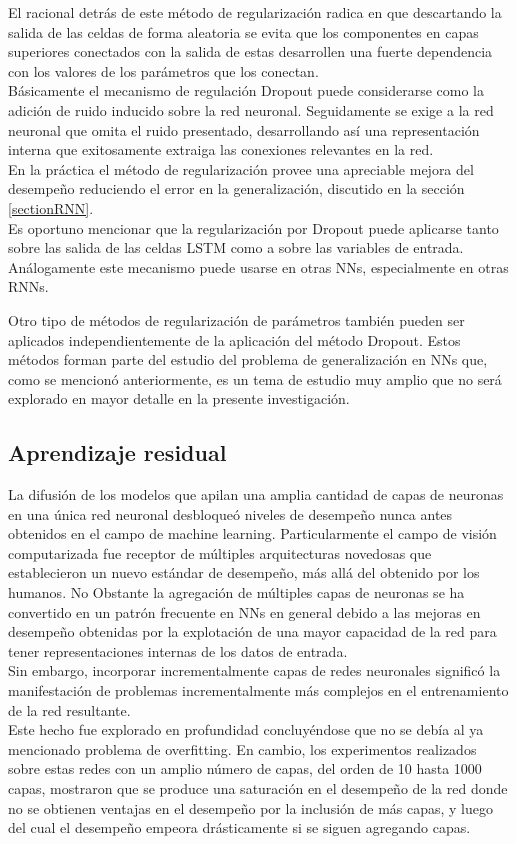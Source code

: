 \documentclass{article}
\begin{document}
	El racional detrás de este método de regularización radica en que descartando la salida de las celdas de forma aleatoria se evita que los componentes en capas superiores conectados con la salida de estas desarrollen una fuerte dependencia con los valores de los parámetros que los conectan.\\
	Básicamente el mecanismo de regulación Dropout puede considerarse como la adición de ruido inducido sobre la red neuronal. Seguidamente se exige a la red neuronal que omita el ruido presentado, desarrollando así una representación interna que exitosamente extraiga las conexiones relevantes en la red.\\
	
	En la práctica el método de regularización provee una apreciable mejora del desempeño reduciendo el error en la generalización, discutido en la sección \ref{sectionRNN}.\\
	Es oportuno mencionar que la regularización por Dropout puede aplicarse tanto sobre las salida de las celdas LSTM como a sobre las variables de entrada. Análogamente este mecanismo puede usarse en otras NNs, especialmente en otras RNNs.
	
	Otro tipo de métodos de regularización de parámetros también pueden ser aplicados independientemente de la aplicación del método Dropout. Estos métodos forman parte del estudio del problema de generalización en NNs que, como se mencionó anteriormente, es un tema de estudio muy amplio que no será explorado en mayor detalle en la presente investigación.
	
	\subsection{Aprendizaje residual}
	La difusión de los modelos que apilan una amplia cantidad de capas de neuronas en una única red neuronal desbloqueó niveles de desempeño nunca antes obtenidos en el campo de machine learning. Particularmente el campo de visión computarizada fue receptor de múltiples arquitecturas novedosas que establecieron un nuevo estándar de desempeño, más allá del obtenido por los humanos\cite{27DNNAgainstHumans}. No Obstante la agregación de múltiples capas de neuronas se ha convertido en un patrón frecuente en NNs en general debido a las mejoras en desempeño obtenidas por la explotación de una mayor capacidad de la red para tener representaciones internas de los datos de entrada.\\
	
	Sin embargo, incorporar incrementalmente capas de redes neuronales significó la manifestación de problemas incrementalmente más complejos en el entrenamiento de la red resultante\cite{6Generalization}.\\
	Este hecho fue explorado en profundidad concluyéndose que no se debía al ya mencionado problema de overfitting. En cambio, los experimentos realizados sobre estas redes con un amplio número de capas, del orden de 10 hasta 1000 capas, mostraron que se produce una saturación en el desempeño de la red donde no se obtienen ventajas en el desempeño por la inclusión de más capas, y luego del cual el desempeño empeora drásticamente si se siguen agregando capas.\\
	
\end{document}
